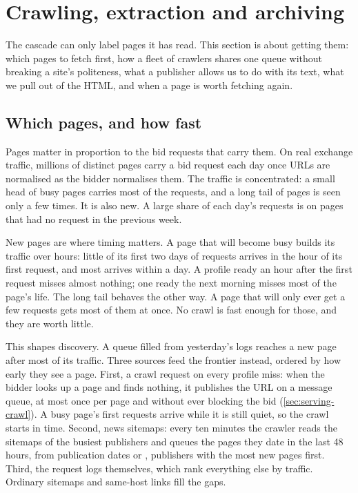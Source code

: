 \section{Crawling, extraction and archiving}\label{sec:crawl}

The cascade can only label pages it has read. This section is about getting them: which pages to fetch first, how a fleet of crawlers shares one queue without breaking a site's politeness, what a publisher allows us to do with its text, what we pull out of the HTML, and when a page is worth fetching again.

\subsection{Which pages, and how fast}\label{sec:crawl-which}

Pages matter in proportion to the bid requests that carry them. On real exchange traffic, millions of distinct pages carry a bid request each day once URLs are normalised as the bidder normalises them. The traffic is concentrated: a small head of busy pages carries most of the requests, and a long tail of pages is seen only a few times. It is also new. A large share of each day's requests is on pages that had no request in the previous week.

New pages are where timing matters. A page that will become busy builds its traffic over hours: little of its first two days of requests arrives in the hour of its first request, and most arrives within a day. A profile ready an hour after the first request misses almost nothing; one ready the next morning misses most of the page's life. The long tail behaves the other way. A page that will only ever get a few requests gets most of them at once. No crawl is fast enough for those, and they are worth little.

This shapes discovery. A queue filled from yesterday's logs reaches a new page after most of its traffic. Three sources feed the frontier instead, ordered by how early they see a page. First, a crawl request on every profile miss: when the bidder looks up a page and finds nothing, it publishes the URL on a message queue, at most once per page and without ever blocking the bid (\cref{sec:serving-crawl}). A busy page's first requests arrive while it is still quiet, so the crawl starts in time. Second, news sitemaps: every ten minutes the crawler reads the sitemaps of the busiest publishers and queues the pages they date in the last 48 hours, from publication dates or , publishers with the most new pages first. Third, the request logs themselves, which rank everything else by traffic. Ordinary sitemaps and same-host links fill the gaps.

